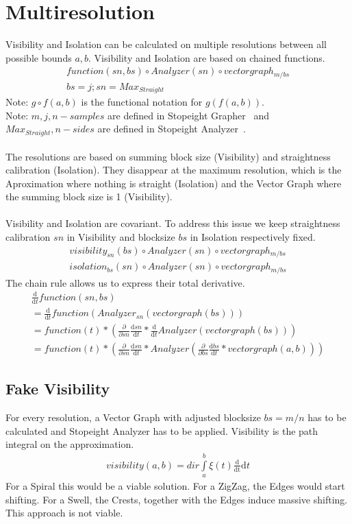 \documentclass{report}
\begin{document}
\chapter{Multiresolution}
Visibility and Isolation can be calculated on multiple resolutions between all possible bounds $a,b$.
Visibility and Isolation are based on chained functions.
\begin{align*}
function(sn,bs) \circ Analyzer(sn) \circ vectorgraph_{m/bs}\\
bs=j;sn=Max_{Straight}
\end{align*}
Note: $g \circ f(a,b)$ is the functional notation for $g(f(a,b))$.\\
Note: $m,j,n-samples$ are defined in Stopeight Grapher~\cite{Grapher} and $Max_{Straight},n-sides$ are defined in Stopeight Analyzer~\cite{Analyzer}.\\\\
The resolutions are based on summing block size (Visibility) and straightness calibration (Isolation). They disappear at the maximum resolution, which is the Aproximation where nothing is straight (Isolation) and the Vector Graph where the summing block size is 1 (Visibility).\\\\
Visibility and Isolation are covariant. To address this issue we keep straightness calibration $sn$ in Visibility and blocksize $bs$ in Isolation respectively fixed.
\begin{align}
visibility_{sn}(bs) \circ Analyzer(sn) \circ vectorgraph_{m/bs}\\
isolation_{bs}(sn) \circ Analyzer(sn) \circ vectorgraph_{m/bs}
\end{align}
The chain rule allows us to express their total derivative.
\begin{align}
\frac{\mathrm{d}}{\mathrm{d} t} function (sn,bs)\\
= \frac{\mathrm{d}}{\mathrm{d} t} function (Analyzer_{sn}(vectorgraph(bs)))\\
= function(t)* (\frac{\partial}{\partial sn}  \frac{\mathrm{d} sn}{\mathrm{d}t} * \frac{\mathrm{d}}{\mathrm{d} t}Analyzer(vectorgraph(bs)))\\
= function(t)* (\frac{\partial}{\partial sn}  \frac{\mathrm{d} sn}{\mathrm{d}t} * Analyzer(\frac{\partial}{\partial bs} \frac{\mathrm{d} bs}{\mathrm{d}t}*vectorgraph(a,b)))
\end{align}

\section{Fake Visibility}
For every resolution, a Vector Graph with adjusted blocksize $bs=m/n$ has to be calculated and Stopeight Analyzer has to be applied.
Visibility is the path integral on the approximation.
\begin{align}
visibility(a,b)= dir \int \limits _{a}^{b} \xi(t)\frac{\mathrm{d}}{\mathrm{dt}} \mathrm{d}t
\end{align}
For a Spiral this would be a viable solution.
For a ZigZag, the Edges would start shifting.
For a Swell, the Crests, together with the Edges induce massive shifting.
This approach is not viable.
\end{document}
